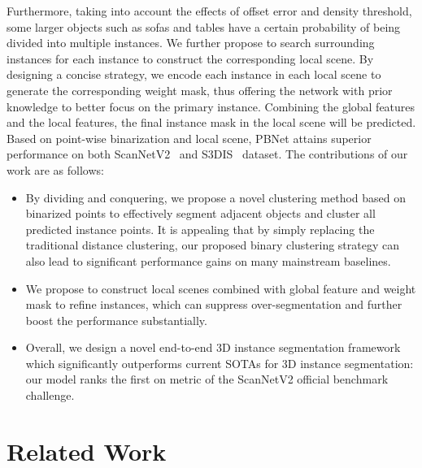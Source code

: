 \documentclass[10pt,twocolumn,letterpaper]{article}
\begin{document}
Furthermore, taking into account the effects of offset error and density threshold, some larger objects such as sofas and tables have a certain probability of being divided into multiple instances. We further propose to search surrounding instances for each instance to construct the corresponding local scene. By designing a concise strategy, we encode each instance in each local scene to generate the corresponding weight mask, thus offering the network with prior knowledge to better focus  on the primary instance. Combining the global features and the local features, the final instance mask in the local scene will be predicted. Based on point-wise binarization and local scene, PBNet attains superior performance  on both ScanNetV2~\cite{dai2017scannet} and S3DIS~\cite{armeni20163d} dataset. The contributions of our work are as follows:

\begin{itemize}
	
	\item By dividing and conquering, we propose a novel clustering method based on binarized points to effectively segment adjacent objects and cluster all predicted instance points. It is appealing that by simply replacing the traditional distance clustering, our proposed  binary clustering strategy can also lead to significant performance gains on many mainstream baselines.
	\item We propose to construct local scenes combined with global feature and weight mask to refine instances, which can suppress over-segmentation and further boost the performance substantially.
	\item  Overall, we design a novel end-to-end 3D instance segmentation framework which significantly outperforms current SOTAs  for 3D instance segmentation: our model ranks the first on   metric  of the ScanNetV2 official benchmark challenge.
	
\end{itemize}

\section{Related Work}
\end{document}
